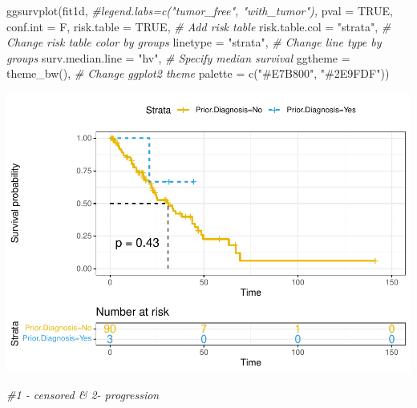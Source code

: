 \documentclass[
  11pt,
]{article}
\newenvironment{Shaded}{\begin{snugshade}}{\end{snugshade}}
\newcommand{\AttributeTok}[1]{\textcolor[rgb]{0.77,0.63,0.00}{#1}}
\newcommand{\CommentTok}[1]{\textcolor[rgb]{0.56,0.35,0.01}{\textit{#1}}}
\newcommand{\ConstantTok}[1]{\textcolor[rgb]{0.00,0.00,0.00}{#1}}
\newcommand{\FunctionTok}[1]{\textcolor[rgb]{0.00,0.00,0.00}{#1}}
\newcommand{\NormalTok}[1]{#1}
\newcommand{\StringTok}[1]{\textcolor[rgb]{0.31,0.60,0.02}{#1}}
\begin{document}
\begin{Shaded}
\begin{Highlighting}[]
\FunctionTok{ggsurvplot}\NormalTok{(fit1d,}
          \CommentTok{\#legend.labs=c("tumor\_free", "with\_tumor"),}
          \AttributeTok{pval =} \ConstantTok{TRUE}\NormalTok{, }\AttributeTok{conf.int =}\NormalTok{ F,}
          \AttributeTok{risk.table =} \ConstantTok{TRUE}\NormalTok{, }\CommentTok{\# Add risk table}
          \AttributeTok{risk.table.col =} \StringTok{"strata"}\NormalTok{, }\CommentTok{\# Change risk table color by groups}
          \AttributeTok{linetype =} \StringTok{"strata"}\NormalTok{, }\CommentTok{\# Change line type by groups}
          \AttributeTok{surv.median.line =} \StringTok{"hv"}\NormalTok{, }\CommentTok{\# Specify median survival}
          \AttributeTok{ggtheme =} \FunctionTok{theme\_bw}\NormalTok{(), }\CommentTok{\# Change ggplot2 theme}
          \AttributeTok{palette =} \FunctionTok{c}\NormalTok{(}\StringTok{"\#E7B800"}\NormalTok{, }\StringTok{"\#2E9FDF"}\NormalTok{))}
\end{Highlighting}
\end{Shaded}

\includegraphics{new_surv_2_files/figure-latex/unnamed-chunk-12-1.pdf}

\begin{Shaded}
\begin{Highlighting}[]
\CommentTok{\#1 {-} censored \& 2{-} progression}
\end{Highlighting}
\end{Shaded}
\end{document}
